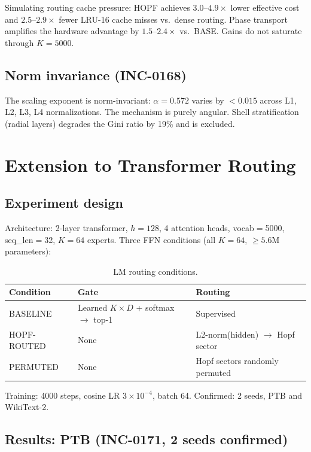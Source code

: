 \documentclass[11pt]{article}
\begin{document}
Simulating routing cache pressure:
HOPF achieves $3.0$--$4.9\times$ lower effective cost and $2.5$--$2.9\times$
fewer LRU-16 cache misses vs.\ dense routing.
Phase transport amplifies the hardware advantage by $1.5$--$2.4\times$ vs.\ BASE.
Gains do not saturate through $K{=}5000$.

\subsection{Norm invariance (INC-0168)}

The scaling exponent is norm-invariant: $\alpha{=}0.572$ varies by $<0.015$ across L1,
L2, L3, L4 normalizations.
The mechanism is purely angular.
Shell stratification (radial layers) degrades the Gini ratio by 19\% and is excluded.

\section{Extension to Transformer Routing}

\subsection{Experiment design}

Architecture: 2-layer transformer, $h{=}128$, 4 attention heads, vocab$=$5000,
seq\_len$=$32, $K{=}64$ experts.
Three FFN conditions (all $K{=}64$, $\ge 5.6$M parameters):

\begin{table}[h]
\centering
\caption{LM routing conditions.}
\label{tab:conditions}
\begin{tabular}{lll}
\toprule
Condition     & Gate             & Routing \\
\midrule
BASELINE      & Learned $K{\times}D$ + softmax $\to$ top-1 & Supervised \\
HOPF-ROUTED   & None             & L2-norm(hidden) $\to$ Hopf sector \\
PERMUTED      & None             & Hopf sectors randomly permuted \\
\bottomrule
\end{tabular}
\end{table}

Training: 4000 steps, cosine LR $3\times10^{-4}$, batch 64.
Confirmed: 2 seeds, PTB and WikiText-2.

\subsection{Results: PTB (INC-0171, 2 seeds confirmed)}
\end{document}
